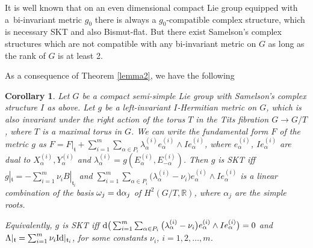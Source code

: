 \documentclass[10pt,a4paper]{amsart}
\numberwithin{equation}{section}
\newtheorem{Corollary}[Theorem]{Corollary}
\begin{document}
\begin{Remark} It is well known that on an even dimensional compact Lie group equipped with a~bi-invariant metric $g_0$ there is always a $g_0$-compatible complex structure, which is necessary SKT and also Bismut-flat. But there exist Samelson's complex structures which are not compatible with any bi-invariant metric on $G$ as long as the rank of $G$ is at least 2.
\end{Remark}

As a consequence of Theorem \ref{lemma2}, we have the following

\begin{Corollary} \label{th4.1bis}
Let $G$ be a compact semi-simple Lie group with Samelson's complex structure $I$ as above. Let $g$ be a left-invariant $I$-Hermitian metric on $G$, which is also invariant under the right action of the torus $T$ in the Tits fibration $G\rightarrow G/T$, where $T$ is a maximal torus in $G$. We can write the fundamental form $F$ of the metric $g$
as $F = F|_{\mathfrak t} + \sum_{i=1}^m \sum_{\alpha \in P_i} \lambda_{\alpha} ^{(i)} e_{\alpha}^{(i)} \wedge I e_{\alpha}^{(i)}$, where $e_{\alpha}^{(i)}$, $Ie_{\alpha}^{(i)}$ are dual to $X_{\alpha}^{(i)}, Y_{\alpha}^{(i)}$ and $\lambda_{\alpha} ^{(i)}= g (E_{\alpha}^{(i)}, E_{-\alpha}^{(i)})$. Then
 $g$ is SKT iff $g |_{\mathfrak t} = - \sum_{i =1}^m \nu_i B|_{\mathfrak t_i}$ and $ \sum_{i =1}^m \sum_{\alpha \in P_i} \big(\lambda_{\alpha}^{(i)} - \nu_i\big) e_{\alpha}^{(i)} \wedge I e_{\alpha}^{(i)}$ is a linear combination of the basis $\omega_j = {\rm d} \alpha_j$ of $H^2(G/T, \mathbb R)$, where $\alpha_j$ are the simple roots.

Equivalently, $g$ is SKT iff ${\rm d}\big( \sum_{i =1}^m \sum_{\alpha \in P_i} \big(\lambda_{\alpha}^{(i)} - \nu_i\big) e_{\alpha}^{(i)}\wedge I e_{\alpha}^{(i)}\big)=0$ and $\Lambda |_{\mathfrak t} = \sum_{i=1}^m \nu_i {\rm Id}|_{\mathfrak t_i}$, for some constants $\nu_i$, $i= 1,2, \dots, m$.
\end{Corollary}
\end{document}
